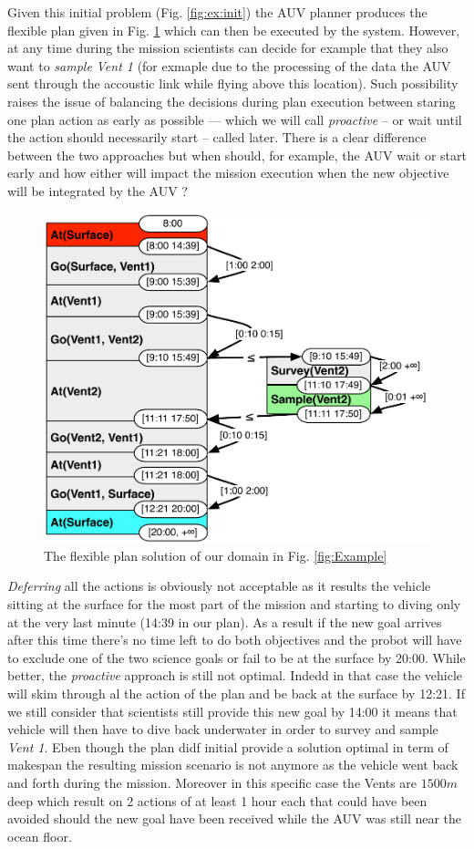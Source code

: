 Given this initial problem (Fig. \ref{fig:ex:init}) the AUV planner
produces the flexible plan given in Fig. \ref{fig:ex:plan} which can
then be executed by the system. However, at any time during the
mission scientists can decide for example that they also want to {\em
  sample} {\em Vent 1} (for exmaple due to the processing of the data
the AUV sent through the accoustic link while flying above this
location). Such possibility raises the issue of balancing the
decisions during plan execution between staring one plan action as
early as possible --- which we will call {\em proactive} -- or wait
until the action should necessarily start -- called later. There is a 
clear difference between the two approaches but when should, for 
example, the AUV wait or start early and how either will impact the
mission execution when the new objective will be integrated by the 
AUV ? 

\begin{figure}[!htb]
  \centering
  \includegraphics[width=0.8\columnwidth]{figs/example_plan}
  \caption{The flexible plan solution of our domain in
    Fig. \ref{fig:Example}}
  \label{fig:ex:plan}
\end{figure}

{\em Deferring} all the actions is obviously not acceptable as 
it results the vehicle sitting at the surface for the most part of the
mission and starting to diving only at the very last minute (14:39 in
our plan). As a result if the new goal arrives after this time there's
no time left to do both objectives and the probot will have to exclude
one of the two science goals or fail to be at the surface by
20:00. While better, the {\em proactive} approach is still not
optimal. Indedd in that case the vehicle will skim through al the
action of the plan and be back at the surface by 12:21. If we still
consider that scientists still provide this new goal by 14:00  it
means that vehicle  will then have to dive back underwater in order to
survey and sample {\em Vent 1}. Eben though the plan didf initial
provide a solution optimal in term of makespan the resulting mission
scenario is not anymore as the vehicle went back and forth during the
mission. Moreover in this specific case the Vents are $1500 m$ deep
which result on 2 actions of at least 1 hour each that could have been
avoided should the new goal have been received while the AUV was still 
near the ocean floor. 

